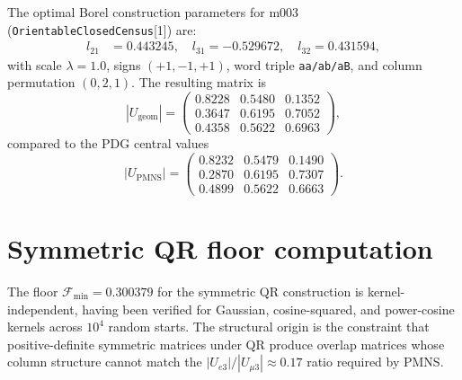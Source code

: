 \documentclass[11pt,a4paper]{article}
\begin{document}
The optimal Borel construction parameters for m003
(\texttt{OrientableClosedCensus}[1]) are:
\begin{align}
l_{21} &= 0.443245, \quad l_{31} = -0.529672, \quad l_{32} = 0.431594,
\end{align}
with scale $\lambda = 1.0$, signs $(+1, -1, +1)$, word triple
\texttt{aa/ab/aB}, and column permutation $(0, 2, 1)$.
The resulting matrix is
\begin{equation}
|U_{\mathrm{geom}}| = \begin{pmatrix}
0.8228 & 0.5480 & 0.1352 \\
0.3647 & 0.6195 & 0.7052 \\
0.4358 & 0.5622 & 0.6963
\end{pmatrix},
\end{equation}
compared to the PDG central values
\begin{equation}
|U_{\mathrm{PMNS}}| = \begin{pmatrix}
0.8232 & 0.5479 & 0.1490 \\
0.2870 & 0.6195 & 0.7307 \\
0.4899 & 0.5622 & 0.6663
\end{pmatrix}.
\end{equation}

\section{Symmetric QR floor computation}
\label{app:floor}

The floor $\mathcal{F}_{\min} = 0.300379$ for the symmetric QR
construction is kernel-independent, having been verified for
Gaussian, cosine-squared, and power-cosine kernels across
$10^4$ random starts. The structural origin is the constraint
that positive-definite symmetric matrices under QR produce
overlap matrices whose column structure cannot match the
$|U_{e3}|/|U_{\mu 3}| \approx 0.17$ ratio required by PMNS.
\end{document}
